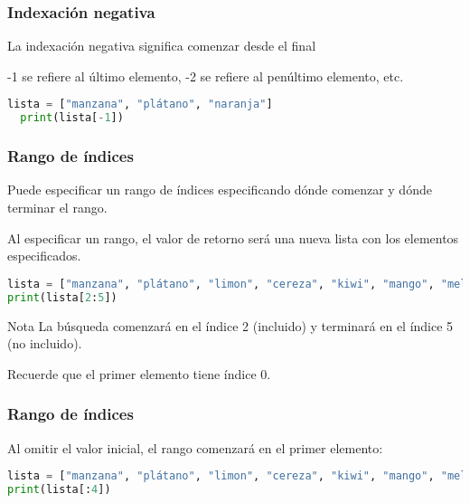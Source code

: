 \begin{frame}[fragile]
  \frametitle{Indexación negativa}

  La indexación negativa significa comenzar desde el final

  \vspace{\baselineskip}
  -1 se refiere al último elemento, -2 se refiere al penúltimo elemento, etc.

  \vspace{\baselineskip}
  \begin{lstlisting}[language=Python]
  lista = ["manzana", "plátano", "naranja"]
  print(lista[-1]) 
  \end{lstlisting}
\end{frame}

\begin{frame}[fragile]
  \frametitle{Rango de índices}

  Puede especificar un rango de índices especificando
  dónde comenzar y dónde terminar el rango.

  \vspace{\baselineskip}
  Al especificar un rango, el valor de retorno será una nueva
  lista con los elementos especificados.

  \vspace{\baselineskip}
  \begin{lstlisting}[language=Python]
lista = ["manzana", "plátano", "limon", "cereza", "kiwi", "mango", "melon"]
print(lista[2:5]) 
  \end{lstlisting}

  \pausa
  \begin{alertblock}{Nota}
    La búsqueda comenzará en el índice 2 (incluido)
    y terminará en el índice 5 (no incluido). 

    Recuerde que el primer elemento tiene índice 0.
  \end{alertblock}
\end{frame}

\begin{frame}[fragile]
  \frametitle{Rango de índices}

  Al omitir el valor inicial, el rango comenzará en el primer elemento: 
  \vspace{\baselineskip}
  \begin{lstlisting}[language=Python]
lista = ["manzana", "plátano", "limon", "cereza", "kiwi", "mango", "melon"]
print(lista[:4]) 
  \end{lstlisting}
\end{frame}

